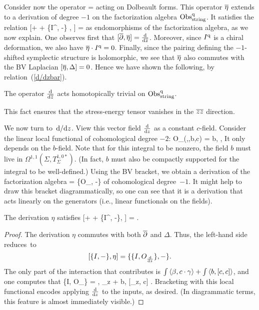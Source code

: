 Consider now the operator 
\ben
\Bar{\eta} = \frac{\partial}{\partial (\d \zbar)} 
\een 
acting on Dolbeault forms. 
This operator $\Bar{\eta}$ extends to a derivation of degree $-1$ on the factorization algebra $\Obs^\q_{\rm string}$. 
It satisfies the relation
\be\label{d/dzbar}
[\dbar + \hbar \Delta + \{I^\q, -\} , \Bar{\eta}] =  \frac{\d}{\d \zbar}
\ee
as endomorphisms of the factorization algebra, as we now explain.
One observes first that $[\dbar, \Bar{\eta}] =  \frac{\d}{\d \zbar}$. 
Moreover, since $I^\q$ is a chiral deformation, we also have $\Bar{\eta} \cdot I^\q = 0$. 
Finally, since the pairing defining the $-1$-shifted symplectic structure is holomorphic, 
we see that $\Bar{\eta}$ also commutes with the BV Laplacian $[\Bar{\eta}, \Delta] = 0$. 
Hence we have shown the following, by relation~(\ref{d/dzbar}).

\begin{lem}
The operator $\frac{\d}{\d \zbar}$ acts homotopically trivial on $\Obs^\q_{\rm string}$. 
\end{lem}

This fact ensures that the stress-energy tensor vanishes in the $\zbar\zbar$ direction.

We now turn to~$\d/\d z$.
View this vector field $\frac{\d}{\d z}$ as a constant $c$-field. 
Consider the linear local functional of cohomological degree $-2$:
\ben
O_{}(\beta,\gamma,b,c) = \int \<b, \>,
\een
It only depends on the $b$-field.
Note that for this integral to be nonzero, 
the field $b$ must live in $\Omega^{1,1}(\Sigma , T_\Sigma^{1,0*})$.
(In fact, $b$ must also be compactly supported for the integral to be well-defined.) 
Using the BV bracket, we obtain a derivation of the factorization algebra 
\ben
\eta = \{O_{}, -\}
\een
of cohomological degree~$-1$. 
It might help to draw this bracket diagrammatically, 
so one can see that it is a derivation that acts linearly on the generators
(i.e., linear functionals on the fields).

\begin{lem} 
The derivation $\eta$ satisfies 
\be\label{d/dz}
[\dbar + \hbar \Delta + \{I^\q, -\}, \eta] = .
\ee
\end{lem}
\begin{proof}
The derivation $\eta$ commutes with both $\dbar$ and $\Delta$. 
Thus, the left-hand side reduces~to
\[
[\{I, -\}, \eta] = \{ \{I, O_{\frac{\d}{\d z}}\}, -\}.
\]
The only part of the interaction that contributes is $\int \<\beta, c \cdot \gamma\> + \int \<b, [c,c]\>$, and one computes that
\ben
\{I, O_{}\} = \int \<\beta, \partial_z \gamma\> + \int\<b, [\partial_z, c]\> .
\een
Bracketing with this local functional encodes applying $\frac{\d}{\d z}$ to the inputs, as desired.
(In diagrammatic terms, this feature is almost immediately visible.)
\end{proof}

